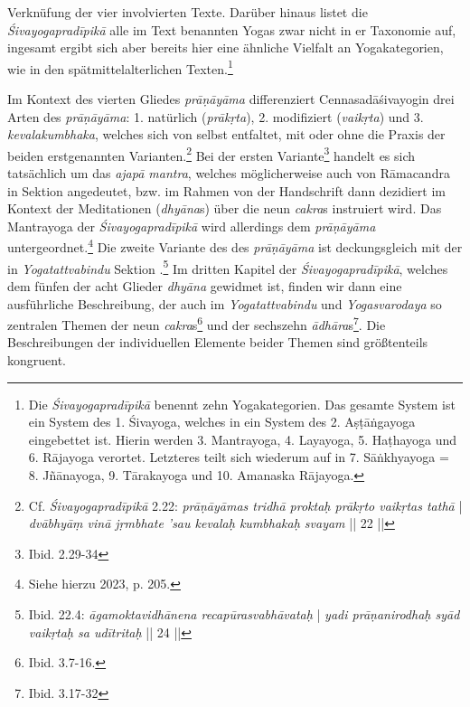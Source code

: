 Verknüfung der vier involvierten Texte. Darüber hinaus listet die \textit{Śivayogapradīpikā} alle im Text benannten Yogas zwar nicht in er Taxonomie auf, ingesamt ergibt sich aber bereits hier eine ähnliche Vielfalt an Yogakategorien, wie in den spätmittelalterlichen Texten.\footnote{Die \textit{Śivayogapradīpikā} benennt zehn Yogakategorien. Das gesamte System ist ein System des 1. Śivayoga, welches in ein System des 2. Aṣṭāṅgayoga eingebettet ist. Hierin werden 3. Mantrayoga, 4. Layayoga, 5. Haṭhayoga und 6. Rājayoga verortet. Letzteres teilt sich wiederum auf in 7. Sāṅkhyayoga = 8. Jñānayoga, 9. Tārakayoga und 10. Amanaska Rājayoga.}

Im Kontext des vierten Gliedes \textit{prāṇāyāma} differenziert Cennasadāśivayogin drei Arten des \textit{prāṇāyāma}: 1. natürlich (\textit{prākṛta}), 2. modifiziert (\textit{vaikṛta}) und 3. \textit{kevalakumbhaka}, welches sich von selbst entfaltet, mit oder ohne die Praxis der beiden erstgenannten Varianten.\footnote{Cf. \textit{Śivayogapradīpikā} 2.22: \textit{prāṇāyāmas tridhā proktaḥ prākṛto vaikṛtas tathā} | \textit{dvābhyāṃ vinā jṛmbhate 'sau kevalaḥ kumbhakaḥ svayam} || 22 ||} Bei der ersten Variante\footnote{Ibid. 2.29-34} handelt es sich tatsächlich um das \textit{ajapā mantra}, welches möglicherweise auch von Rāmacandra in Sektion  angedeutet, bzw. im Rahmen von der Handschrift  dann dezidiert im Kontext der Meditationen (\textit{dhyāna}s) über die neun \textit{cakra}s instruiert wird. Das Mantrayoga der \textit{Śivayogapradīpikā} wird allerdings dem \textit{prāṇāyāma} untergeordnet.\footnote{Siehe hierzu \citeauthor{powell2023} 2023, p. 205.} Die zweite Variante des des \textit{prāṇāyāma} ist deckungsgleich mit der in \textit{Yogatattvabindu} Sektion .\footnote{Ibid. 22.4: \textit{āgamoktavidhānena recapūrasvabhāvataḥ} | \textit{yadi prāṇanirodhaḥ syād vaikṛtaḥ sa udītritaḥ} || 24 ||} Im dritten Kapitel der \textit{Śivayogapradīpikā}, welches dem fünfen der acht Glieder \textit{dhyāna} gewidmet ist, finden wir dann eine ausführliche Beschreibung, der auch im \textit{Yogatattvabindu} und \textit{Yogasvarodaya} so zentralen Themen der neun \textit{cakra}s\footnote{Ibid. 3.7-16.} und der sechszehn \textit{ādhāra}s\footnote{Ibid. 3.17-32}. Die Beschreibungen der individuellen Elemente beider Themen sind größtenteils kongruent.  
